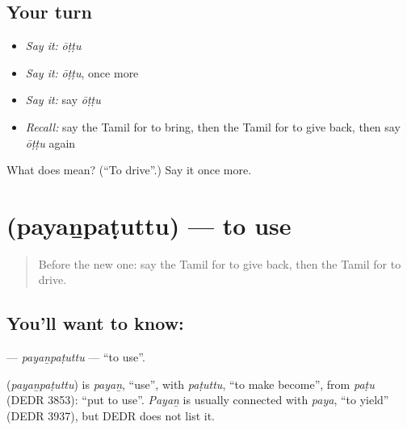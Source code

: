 \subsection*{Your turn}
\begin{itemize}
\raggedright
  \item \emph{Say it:} \emph{ōṭṭu}
  \item \emph{Say it:} \emph{ōṭṭu}, once more
  \item \emph{Say it:} say \emph{ōṭṭu}
  \item \emph{Recall:} say the Tamil for to bring, then the Tamil for to give back, then say \emph{ōṭṭu} again
\end{itemize}

\begin{tcolorbox}[breakable,colback=teal!4,colframe=teal!35!black,title={Before you move on}]
What does  mean? (\textquotedblleft{}To drive\textquotedblright{}.) Say it once more.
\end{tcolorbox}
\section[\texorpdfstring{\ta{பயன்படுத்து} (payaṉpaṭuttu)}{பயன்படுத்து (payaṉpaṭuttu)}]{ (payaṉpaṭuttu) — to use}

\label{lesson:TA-C195-payanpatuttu}



\begin{quote}
Before the new one: say the Tamil for to give back, then the Tamil for to drive.
\end{quote}

\subsection*{You'll want to know: }
\textbf{} — \emph{payaṉpaṭuttu} — \textquotedblleft{}to use\textquotedblright{}.

\begin{cousinweb}
\textbf{} (\emph{payaṉpaṭuttu}) is \emph{payaṉ}, \textquotedblleft{}use\textquotedblright{}, with \emph{paṭuttu}, \textquotedblleft{}to make become\textquotedblright{}, from \emph{paṭu} (DEDR 3853): \textquotedblleft{}put to use\textquotedblright{}. \emph{Payaṉ} is usually connected with \emph{paya}, \textquotedblleft{}to yield\textquotedblright{} (DEDR 3937), but DEDR does not list it.
\end{cousinweb}

